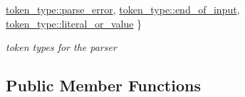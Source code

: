 \begin{DoxyCompactItemize}
\mbox{\hyperlink{classnlohmann_1_1detail_1_1lexer_a3f313cdbe187cababfc5e06f0b69b098a456e19aeafa334241c7ff3f589547f9d}{token\+\_\+type\+::parse\+\_\+error}}, 
\mbox{\hyperlink{classnlohmann_1_1detail_1_1lexer_a3f313cdbe187cababfc5e06f0b69b098aca11f56dd477c09e06583dbdcda0985f}{token\+\_\+type\+::end\+\_\+of\+\_\+input}}, 
\newline
\mbox{\hyperlink{classnlohmann_1_1detail_1_1lexer_a3f313cdbe187cababfc5e06f0b69b098ad2a8e6f6721cccec0b466301dd9495a5}{token\+\_\+type\+::literal\+\_\+or\+\_\+value}}
 \}
\begin{DoxyCompactList}\small\item\em token types for the parser \end{DoxyCompactList}\end{DoxyCompactItemize}
\subsection*{Public Member Functions}
